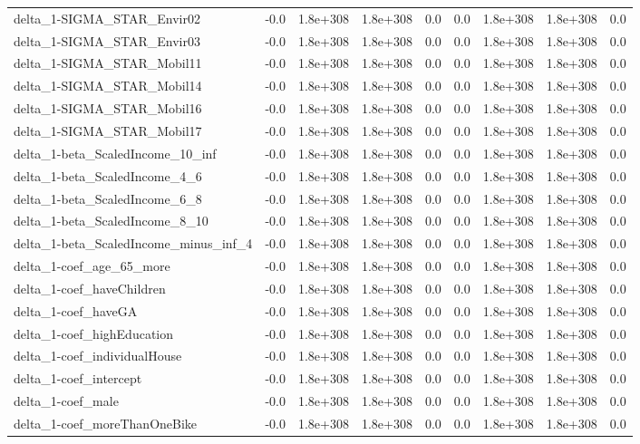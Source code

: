 \begin{tabular}{lrrrrrrrr}
delta_1-SIGMA_STAR_Envir02 & -0.0 & 1.8e+308 & 1.8e+308 & 0.0 & 0.0 & 1.8e+308 & 1.8e+308 & 0.0 \\
delta_1-SIGMA_STAR_Envir03 & -0.0 & 1.8e+308 & 1.8e+308 & 0.0 & 0.0 & 1.8e+308 & 1.8e+308 & 0.0 \\
delta_1-SIGMA_STAR_Mobil11 & -0.0 & 1.8e+308 & 1.8e+308 & 0.0 & 0.0 & 1.8e+308 & 1.8e+308 & 0.0 \\
delta_1-SIGMA_STAR_Mobil14 & -0.0 & 1.8e+308 & 1.8e+308 & 0.0 & 0.0 & 1.8e+308 & 1.8e+308 & 0.0 \\
delta_1-SIGMA_STAR_Mobil16 & -0.0 & 1.8e+308 & 1.8e+308 & 0.0 & 0.0 & 1.8e+308 & 1.8e+308 & 0.0 \\
delta_1-SIGMA_STAR_Mobil17 & -0.0 & 1.8e+308 & 1.8e+308 & 0.0 & 0.0 & 1.8e+308 & 1.8e+308 & 0.0 \\
delta_1-beta_ScaledIncome_10_inf & -0.0 & 1.8e+308 & 1.8e+308 & 0.0 & 0.0 & 1.8e+308 & 1.8e+308 & 0.0 \\
delta_1-beta_ScaledIncome_4_6 & -0.0 & 1.8e+308 & 1.8e+308 & 0.0 & 0.0 & 1.8e+308 & 1.8e+308 & 0.0 \\
delta_1-beta_ScaledIncome_6_8 & -0.0 & 1.8e+308 & 1.8e+308 & 0.0 & 0.0 & 1.8e+308 & 1.8e+308 & 0.0 \\
delta_1-beta_ScaledIncome_8_10 & -0.0 & 1.8e+308 & 1.8e+308 & 0.0 & 0.0 & 1.8e+308 & 1.8e+308 & 0.0 \\
delta_1-beta_ScaledIncome_minus_inf_4 & -0.0 & 1.8e+308 & 1.8e+308 & 0.0 & 0.0 & 1.8e+308 & 1.8e+308 & 0.0 \\
delta_1-coef_age_65_more & -0.0 & 1.8e+308 & 1.8e+308 & 0.0 & 0.0 & 1.8e+308 & 1.8e+308 & 0.0 \\
delta_1-coef_haveChildren & -0.0 & 1.8e+308 & 1.8e+308 & 0.0 & 0.0 & 1.8e+308 & 1.8e+308 & 0.0 \\
delta_1-coef_haveGA & -0.0 & 1.8e+308 & 1.8e+308 & 0.0 & 0.0 & 1.8e+308 & 1.8e+308 & 0.0 \\
delta_1-coef_highEducation & -0.0 & 1.8e+308 & 1.8e+308 & 0.0 & 0.0 & 1.8e+308 & 1.8e+308 & 0.0 \\
delta_1-coef_individualHouse & -0.0 & 1.8e+308 & 1.8e+308 & 0.0 & 0.0 & 1.8e+308 & 1.8e+308 & 0.0 \\
delta_1-coef_intercept & -0.0 & 1.8e+308 & 1.8e+308 & 0.0 & 0.0 & 1.8e+308 & 1.8e+308 & 0.0 \\
delta_1-coef_male & -0.0 & 1.8e+308 & 1.8e+308 & 0.0 & 0.0 & 1.8e+308 & 1.8e+308 & 0.0 \\
delta_1-coef_moreThanOneBike & -0.0 & 1.8e+308 & 1.8e+308 & 0.0 & 0.0 & 1.8e+308 & 1.8e+308 & 0.0 \\

\end{tabular}
